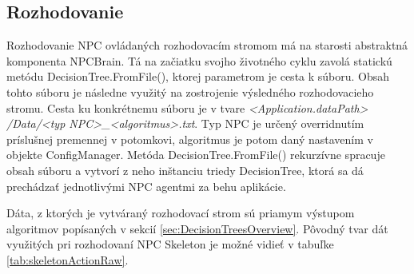 \documentclass[slovak, master]{diploma}
\begin{document}
\subsection{Rozhodovanie}
\label{sec:ImplDecisionTrees}
Rozhodovanie NPC ovládaných rozhodovacím stromom má na starosti abstraktná komponenta NPCBrain. Tá na začiatku svojho životného cyklu zavolá statickú metódu DecisionTree.FromFile(), ktorej parametrom je cesta k súboru. Obsah tohto súboru je následne využitý na zostrojenie výsledného rozhodovacieho stromu. Cesta ku konkrétnemu súboru je v tvare \textit{<Application.dataPath> /Data/<typ NPC>\_<algoritmus>.txt}. Typ NPC je určený overridnutím príslušnej premennej v potomkovi, algoritmus je potom daný nastavením v objekte ConfigManager. Metóda DecisionTree.FromFile() rekurzívne spracuje obsah súboru a vytvorí z neho inštanciu triedy DecisionTree, ktorá sa dá prechádzať jednotlivými NPC agentmi za behu aplikácie.

Dáta, z ktorých je vytváraný rozhodovací strom sú priamym výstupom algoritmov popísaných v sekcií \ref{sec:DecisionTreesOverview}. Pôvodný tvar dát využitých pri rozhodovaní NPC Skeleton je možné vidieť v tabuľke \ref{tab:skeletonActionRaw}.
\end{document}
